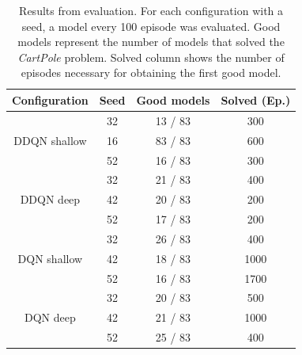 \begin{table}
	\centering
	\begin{tabular}{|c|c|c|c|}
		\hline
		\textbf{Configuration} & \textbf{Seed} & \textbf{Good models} & \textbf{Solved (Ep.)} \\
		\hline
			 & 32 & 13 / 83 & 300 \\
		DDQN shallow & 16 & 83 / 83 & 600 \\
			 & 52 & 16 / 83 & 300 \\
		\hline
		 		& 32 & 21 / 83 & 400 \\
		DDQN deep  & 42 & 20 / 83 & 200 \\
				  & 52 & 17 / 83 & 200 \\
		\hline
					& 32 & 26 / 83 & 400 \\
		DQN	shallow & 42 & 18 / 83 & 1000 \\
					& 52 & 16 / 83 & 1700 \\
		\hline
				 & 32 & 20 / 83 & 500 \\
		DQN deep & 42 & 21 / 83 & 1000 \\
				 & 52 & 25 / 83 & 400 \\
		\hline
	\end{tabular}
	\caption{Results from evaluation. For each configuration with a seed, a model every 100 episode was evaluated. Good models represent the number of models that solved the \textit{CartPole} problem. Solved column shows the number of episodes necessary for obtaining the first good model.}
	\label{tab:comparison_table}
\end{table}
